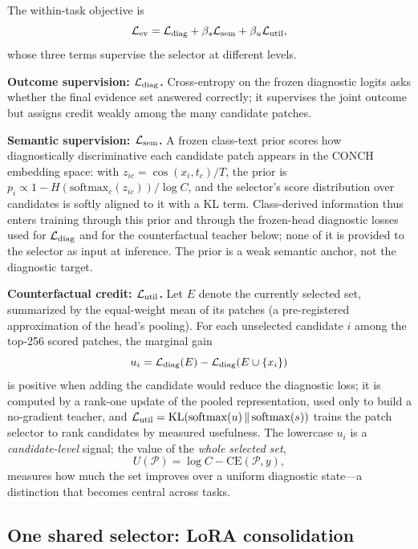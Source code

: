 \documentclass{article}
\def\L{{\cal L}}
\newcommand{\Psel}{\mathcal{P}}
\begin{document}
The within-task objective is
\begin{equation}
\L_{\mathrm{ev}}
=
\L_{\mathrm{diag}}
+\beta_s\L_{\mathrm{sem}}
+\beta_u\L_{\mathrm{util}},
\end{equation}
whose three terms supervise the selector at different levels.

\textbf{Outcome supervision: $\L_{\mathrm{diag}}$.}
Cross-entropy on the frozen diagnostic logits asks whether the final evidence set answered correctly; it supervises the joint outcome but assigns credit weakly among the many candidate patches.

\textbf{Semantic supervision: $\L_{\mathrm{sem}}$.}
A frozen class-text prior scores how diagnostically discriminative each candidate patch appears in the CONCH embedding space: with $z_{ic}=\cos(x_i,t_c)/T$, the prior is $p_i\propto 1-H(\mathrm{softmax}_c(z_{ic}))/\log C$, and the selector's score distribution over candidates is softly aligned to it with a KL term. Class-derived information thus enters training through this prior and through the frozen-head diagnostic losses used for $\L_{\rm diag}$ and for the counterfactual teacher below; none of it is provided to the selector as input at inference. The prior is a weak semantic anchor, not the diagnostic target.

\textbf{Counterfactual credit: $\L_{\mathrm{util}}$.}
Let $E$ denote the currently selected set, summarized by the equal-weight mean of its patches (a pre-registered approximation of the head's pooling). For each unselected candidate $i$ among the top-256 scored patches, the marginal gain
\begin{equation}
u_i
=
\L_{\mathrm{diag}}(E)
-
\L_{\mathrm{diag}}(E\cup\{x_i\})
\label{eq:ui}
\end{equation}
is positive when adding the candidate would reduce the diagnostic loss; it is computed by a rank-one update of the pooled representation, used only to build a no-gradient teacher, and $\L_{\mathrm{util}}=\mathrm{KL}(\mathrm{softmax}(u)\,\Vert\,\mathrm{softmax}(s))$ trains the patch selector to rank candidates by measured usefulness. The lowercase $u_i$ is a \emph{candidate-level} signal; the value of the \emph{whole selected set},
\begin{equation}
U(\Psel)
=
\log C-\mathrm{CE}(\Psel,y),
\label{eq:bigU}
\end{equation}
measures how much the set improves over a uniform diagnostic state---a distinction that becomes central across tasks.

\subsection{One shared selector: LoRA consolidation}
\label{ssec:lora}
\end{document}
